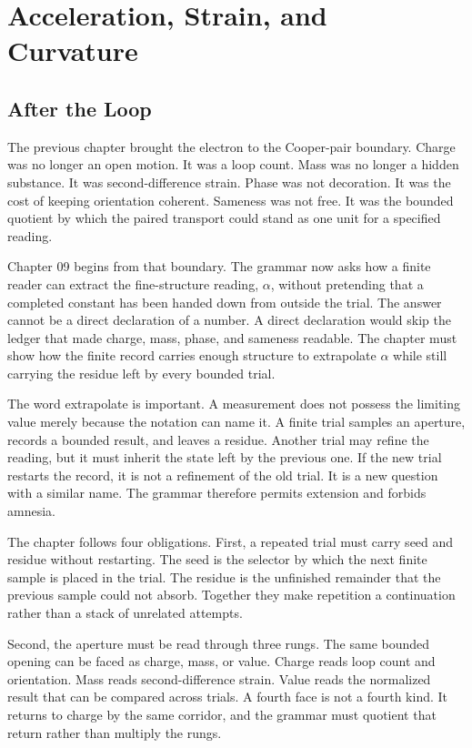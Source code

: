 \chapter{Acceleration, Strain, and Curvature}
\label{chap:finite-extrapolation-alpha}

\section{After the Loop}

The previous chapter brought the electron to the Cooper-pair boundary. Charge
was no longer an open motion. It was a loop count. Mass was no longer a hidden
substance. It was second-difference strain. Phase was not decoration. It was
the cost of keeping orientation coherent. Sameness was not free. It was the
bounded quotient by which the paired transport could stand as one unit for a
specified reading.

Chapter 09 begins from that boundary. The grammar now asks how a finite reader
can extract the fine-structure reading, \(\alpha\), without pretending that a
completed constant has been handed down from outside the trial. The answer
cannot be a direct declaration of a number. A direct declaration would skip the
ledger that made charge, mass, phase, and sameness readable. The chapter must
show how the finite record carries enough structure to extrapolate \(\alpha\)
while still carrying the residue left by every bounded trial.

The word extrapolate is important. A measurement does not possess the limiting
value merely because the notation can name it. A finite trial samples an
aperture, records a bounded result, and leaves a residue. Another trial may
refine the reading, but it must inherit the state left by the previous one.
If the new trial restarts the record, it is not a refinement of the old trial.
It is a new question with a similar name. The grammar therefore permits
extension and forbids amnesia.

The chapter follows four obligations. First, a repeated trial must carry seed
and residue without restarting. The seed is the selector by which the next
finite sample is placed in the trial. The residue is the unfinished remainder
that the previous sample could not absorb. Together they make repetition a
continuation rather than a stack of unrelated attempts.

Second, the aperture must be read through three rungs. The same bounded
opening can be faced as charge, mass, or value. Charge reads loop count and
orientation. Mass reads second-difference strain. Value reads the normalized
result that can be compared across trials. A fourth face is not a fourth kind.
It returns to charge by the same corridor, and the grammar must quotient that
return rather than multiply the rungs.

